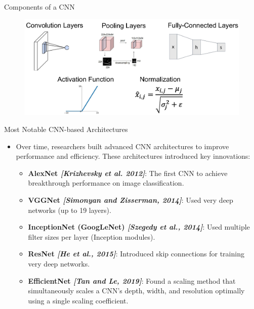 \documentclass[10pt]{beamer}
\theoremstyle{remark}
\theoremstyle{definition}
\begin{document}
\begin{frame}{Components of a CNN}
\begin{figure}
\centering
\includegraphics[width=1.0\textwidth,height=0.9\textheight,keepaspectratio]{./images/components.png}
\end{figure}
    
\end{frame}

\begin{frame}{Most Notable CNN-based Architectures}
\begin{itemize}
    \item Over time, researchers built advanced CNN architectures to improve performance and efficiency. These architectures introduced key innovations:
    \begin{itemize}
    \item \textbf{AlexNet \emph{[Krizhevsky et al. 2012]}}:  The first CNN to achieve breakthrough performance on image classification.
    \item \textbf{VGGNet \emph{[Simonyan and Zisserman, 2014]}}: Used very deep networks (up to 19 layers).
        \item \textbf{InceptionNet (GoogLeNet) \emph{[Szegedy et al., 2014]}}: Used multiple filter sizes per layer (Inception modules).
    \item \textbf{ResNet \emph{[He et al., 2015]}}: Introduced skip connections for training very deep networks.
    \item \textbf{EfficientNet \emph{[Tan and Le, 2019]}}: Found a scaling method that  simultaneously scales a CNN’s depth, width, and resolution optimally using a single scaling coefficient.
    \end{itemize}
\end{itemize}
    
\end{frame}
\end{document}
